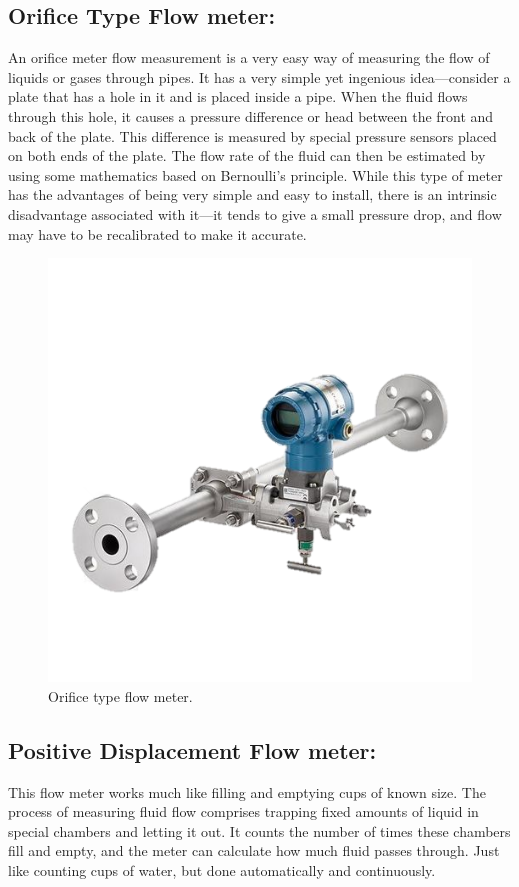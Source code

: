 \subsection{Orifice Type Flow meter:}
An orifice meter flow measurement is a very easy way of measuring the flow of liquids or gases through pipes. It has a very simple yet ingenious idea—consider a plate that has a hole in it and is placed inside a pipe. When the fluid flows through this hole, it causes a pressure difference or head between the front and back of the plate. This difference is measured by special pressure sensors placed on both ends of the plate. The flow rate of the fluid can then be estimated by using some mathematics based on Bernoulli's principle. While this type of meter has the advantages of being very simple and easy to install, there is an intrinsic disadvantage associated with it—it tends to give a small pressure drop, and flow may have to be recalibrated to make it accurate.


\begin{figure}[h!]
    \centering
    \includegraphics[width=0.8\linewidth]{figs/flowmeters/image19.png}
    \caption{Orifice type flow meter.}
    \label{fig:orifice_flow_meter}
\end{figure}


\subsection{Positive Displacement Flow meter:}
This flow meter works much like filling and emptying cups of known size. The process of measuring fluid flow comprises trapping fixed amounts of liquid in special chambers and letting it out. It counts the number of times these chambers fill and empty, and the meter can calculate how much fluid passes through. Just like counting cups of water, but done automatically and continuously. 

